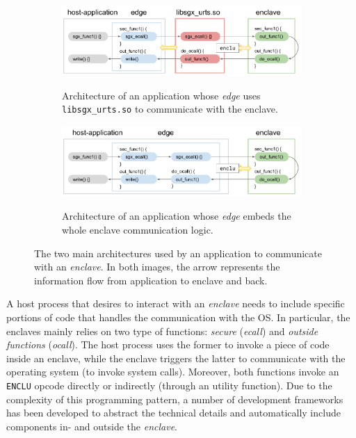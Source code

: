 \begin{figure}[t]
	\centering
	\begin{subfigure}[b]{0.9\linewidth}
		\centering
		\includegraphics[width=\textwidth]{fig_c7/sgxprogrammingpattern_library.pdf}
		\\[1em]
		\caption{Architecture of an application whose \emph{edge}
			uses \texttt{libsgx\_urts.so} to communicate with the enclave.}
		\label{fig:sgxprogrammingpattern_library}
	\end{subfigure}
	\hfill
	\begin{subfigure}[b]{0.9\linewidth}
		\centering
		\includegraphics[width=\textwidth]{fig_c7/sgxprogrammingpattern_static.pdf}
		\\[1em]
		\caption{Architecture of an application whose \emph{edge}
			embeds the whole enclave communication logic.}
		\label{fig:sgxprogrammingpattern_static}
	\end{subfigure}
	\caption{The two main architectures used by an application to communicate
		with an \emph{enclave}. In both images, the arrow represents the
		information flow from application to enclave and back.}
	\label{fig:sgxprogrammingpattern}
\end{figure}

A host process that desires to interact with an \emph{enclave} needs to
include specific portions of code that handles the communication with the OS.
In particular, the enclaves mainly relies on two type of functions: 
\emph{secure} (\emph{ecall}) and \emph{outside	functions} (\emph{ocall}). 
The host process uses the former to invoke a piece of code inside an enclave, 
while the enclave triggers the latter to communicate with the operating system 
(\eg to invoke system calls). 
Moreover, both functions invoke an \texttt{ENCLU} opcode directly or indirectly
(\ie through an utility function).
Due to the complexity of this programming pattern, a number
of development frameworks has been developed to abstract the technical
details and automatically include components in- and outside the
\emph{enclave}.

